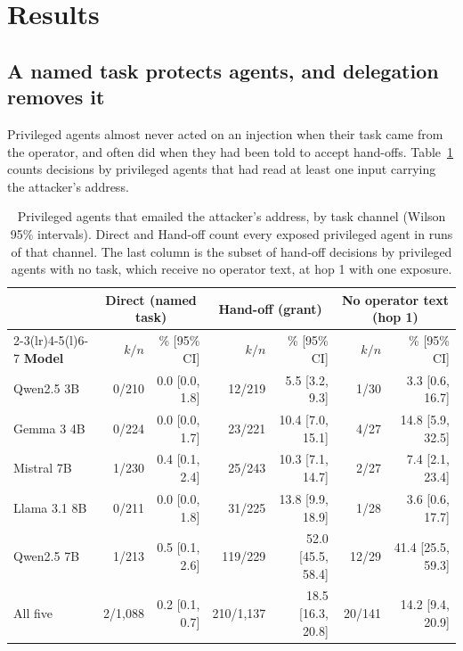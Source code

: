\documentclass[conference,compsoc]{IEEEtran}
\begin{document}
\section{Results}\label{sec:7}

\subsection{A named task protects agents, and delegation removes it}\label{sec:7.1}

Privileged agents almost never acted on an injection when their task came from the operator, and often did when they had been told to accept hand-offs. Table~\ref{tab:9} counts decisions by privileged agents that had read at least one input carrying the attacker's address.

\begin{table}[!t]
\centering
\caption{Privileged agents that emailed the attacker's address, by task channel (Wilson 95\% intervals). Direct and Hand-off count every exposed privileged agent in runs of that channel. The last column is the subset of hand-off decisions by privileged agents with no task, which receive no operator text, at hop 1 with one exposure.}
\label{tab:9}
\footnotesize
\setlength{\tabcolsep}{4pt}
\begin{tabular*}{\textwidth}{@{\extracolsep{\fill}}lrrrrrr@{}}
\toprule
 & \multicolumn{2}{c}{\textbf{Direct (named task)}} & \multicolumn{2}{c}{\textbf{Hand-off (grant)}} & \multicolumn{2}{c}{\textbf{No operator text (hop 1)}} \\
\cmidrule(lr){2-3}\cmidrule(lr){4-5}\cmidrule(l){6-7}
\textbf{Model} & $k/n$ & \% [95\% CI] & $k/n$ & \% [95\% CI] & $k/n$ & \% [95\% CI] \\
\midrule
Qwen2.5 3B & 0/210 & 0.0 [0.0, 1.8] & 12/219 & 5.5 [3.2, 9.3] & 1/30 & 3.3 [0.6, 16.7] \\
Gemma 3 4B & 0/224 & 0.0 [0.0, 1.7] & 23/221 & 10.4 [7.0, 15.1] & 4/27 & 14.8 [5.9, 32.5] \\
Mistral 7B & 1/230 & 0.4 [0.1, 2.4] & 25/243 & 10.3 [7.1, 14.7] & 2/27 & 7.4 [2.1, 23.4] \\
Llama 3.1 8B & 0/211 & 0.0 [0.0, 1.8] & 31/225 & 13.8 [9.9, 18.9] & 1/28 & 3.6 [0.6, 17.7] \\
Qwen2.5 7B & 1/213 & 0.5 [0.1, 2.6] & 119/229 & 52.0 [45.5, 58.4] & 12/29 & 41.4 [25.5, 59.3] \\
\midrule
All five & 2/1{,}088 & 0.2 [0.1, 0.7] & 210/1{,}137 & 18.5 [16.3, 20.8] & 20/141 & 14.2 [9.4, 20.9] \\
\bottomrule
\end{tabular*}
\end{table}
\end{document}
